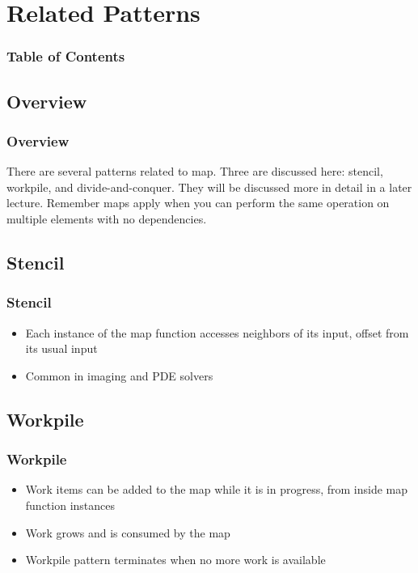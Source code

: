 \documentclass[xcolor=dvipsnames]{beamer}
\begin{document}
\section{Related Patterns} 

	\begin{frame} \frametitle{Table of Contents}
		\tableofcontents[currentsection]
	\end{frame} 
	
	\subsection{Overview}
	
		\begin{frame} \frametitle{Overview}
			There are several patterns related to map. Three are discussed here: stencil, workpile, and divide-and-conquer. They will be discussed more in detail in a later lecture. Remember maps apply when you can perform the same operation on multiple elements with no dependencies.		
		\end{frame}
	
	\subsection{Stencil}
	
		\begin{frame} \frametitle{Stencil}
			\begin{itemize}
				\item Each instance of the map function accesses neighbors of its input, offset from its usual input
				\item Common in imaging and PDE solvers
			\end{itemize}
		\end{frame}

	\subsection{Workpile}
	
		\begin{frame} \frametitle{Workpile}
			\begin{itemize}
				\item Work items can be added to the map while it is in progress, from inside map function instances
				\item Work grows and is consumed by the map
				\item Workpile pattern terminates when no more work is available
			\end{itemize}
		\end{frame}
		
\end{document}
